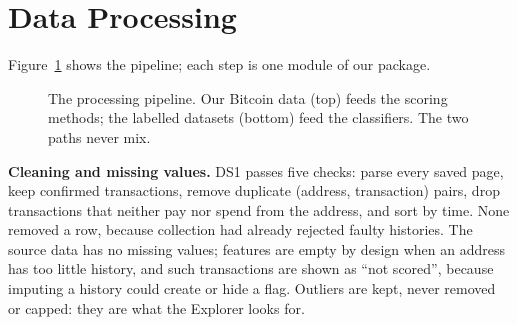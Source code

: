 \section{Data Processing}
\label{sec:processing}

Figure~\ref{fig:pipeline} shows the pipeline; each step is one module of our  package.

\begin{figure}[ht]
\centering
{}
\caption{The processing pipeline. Our Bitcoin data (top) feeds the scoring methods; the labelled datasets
(bottom) feed the classifiers. The two paths never mix.}
\label{fig:pipeline}
\end{figure}

\textbf{Cleaning and missing values.} DS1 passes five checks: parse every saved page, keep confirmed
transactions, remove duplicate (address, transaction) pairs, drop transactions that neither pay nor spend from
the address, and sort by time. None removed a row, because collection had already rejected faulty histories. The
source data has no missing values; features are empty by design when an address has too little history, and such
transactions are shown as ``not scored'', because imputing a history could create or hide a flag. Outliers are
kept, never removed or capped: they are what the Explorer looks for.

